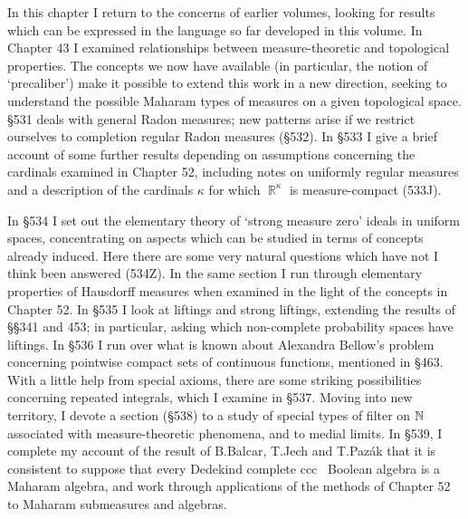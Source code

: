  
\def\chaptername{Topologies and measures III} 
 
 
In this chapter I return to the concerns of earlier volumes, looking for 
results which can be expressed in the language so far developed in this 
volume.    
In Chapter 43 I examined relationships between measure-theoretic and 
topological properties.   The concepts we now have available (in 
particular, the notion of `precaliber') make it possible to extend this 
work in a new direction, seeking to understand the possible Maharam 
types of measures on a given topological space. 
\S531 deals with general Radon measures;  new patterns arise if we 
restrict ourselves to completion regular Radon measures (\S532). 
In \S533 I give a brief account of some further 
results depending on assumptions 
concerning the cardinals examined in Chapter 52, including  
notes on uniformly regular measures and a description 
of the cardinals $\kappa$ for which $\BbbR^{\kappa}$ is measure-compact 
(533J). 
 
In \S534 I set out the elementary theory of `strong measure zero' ideals in 
uniform spaces, concentrating on aspects which can be studied in terms of 
concepts already induced.   Here there are some very natural questions  
which have not I think been answered (534Z).   In the same section I run 
through elementary  
properties of Hausdorff measures when examined in the light of 
the concepts in Chapter 52.   In \S535 I look at 
liftings and strong liftings, extending the results of \S\S341 and 453; 
in particular, asking which 
non-complete probability spaces have liftings.   In \S536 I run over 
what is known about Alexandra Bellow's problem concerning pointwise 
compact sets of continuous functions, mentioned in \S463.   With a little 
help from special axioms, there are some striking possibilities concerning 
repeated integrals, which I examine in \S537. 
Moving into new territory, I devote a section (\S538) to a study of special 
types of filter on $\Bbb N$ associated with measure-theoretic phenomena, 
and to medial limits. 
In \S539, I complete my account of the result of B.Balcar, T.Jech and 
T.Paz\'ak that it is consistent to suppose that every Dedekind complete ccc 
\wsid\ Boolean algebra is a Maharam algebra, and work through applications 
of the methods of Chapter 52 to Maharam submeasures and algebras. 
 
\discrpage 
 
